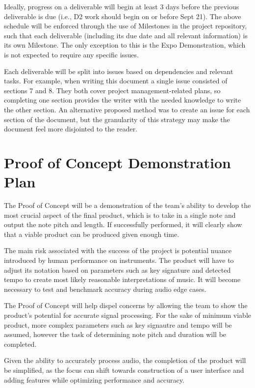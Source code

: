 \documentclass{article}
\begin{document}
Ideally, progress on a deliverable will begin at least 3 days before the previous deliverable is due (i.e., D2 work should begin on or before Sept 21). 
The above schedule will be enforced through the use of Milestones in the project repository, such that each deliverable (including its due date and all relevant information) 
is its own Milestone. The only exception to this is the Expo Demonstration, which is not expected to require any specific issues.

Each deliverable will be split into issues based on dependencies and relevant tasks. For example, when writing this document a single issue consisted of sections 7 and 8. 
They both cover project management-related plans, so completing one section provides the writer with the needed knowledge to write the other section. An alternative proposed 
method was to create an issue for each section of the document, but the granularity of this strategy may make the document feel more disjointed to the reader.

\section{Proof of Concept Demonstration Plan}

The Proof of Concept will be a demonstration of the team’s ability to develop the most crucial aspect of the final product, which is to take in a single note and output the note pitch and length. If successfully performed, it will clearly show that a viable product can be produced given enough time. 

The main risk associated with the success of the project is potential nuance introduced by human performance on instruments. The product will have to adjust its notation based on parameters such as key signature and detected tempo to create most likely reasonable interpretations of music. It will become necessary to test and benchmark accuracy during audio edge cases. 

The Proof of Concept will help dispel concerns by allowing the team to show the product's potential for accurate signal processing. For the sake of minimum viable product, more complex parameters such as key signautre and tempo will be assumed, however the task of determining note pitch and duration will be completed.

Given the ability to accurately process audio, the completion of the product will be simplified, as the focus can shift towards construction of a user interface and adding features while optimizing performance and accuracy.
\end{document}
